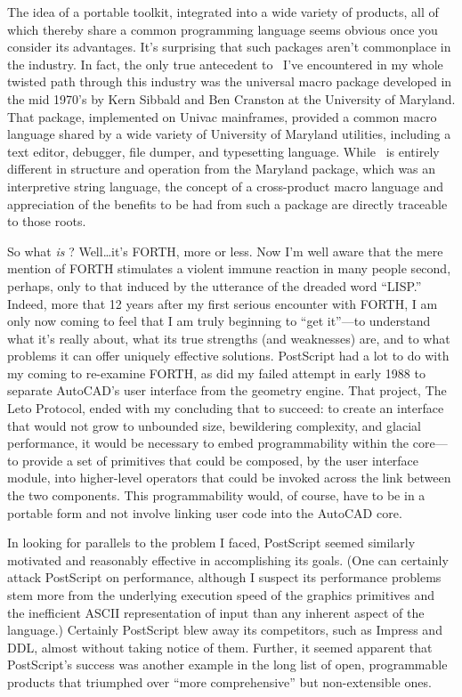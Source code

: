 \documentclass[twocolumn]{article}
\begin{document}
The idea of a portable toolkit, integrated into a wide variety of
products, all of which thereby share a common programming language
seems obvious once you consider its advantages.  It's surprising
that such packages aren't commonplace in the industry.  In fact,
the only true antecedent to \atlast\ I've encountered in my whole twisted
path through this industry was the universal macro package developed
in the mid 1970's by Kern Sibbald and Ben Cranston at the University
of Maryland.  That package, implemented on Univac mainframes, provided
a common macro language shared by a wide variety of University of
Maryland utilities, including a text editor, debugger, file dumper,
and typesetting language.  While \atlast\ is entirely different in
structure and operation from the Maryland package, which was an
interpretive string language, the concept of a cross-product macro
language and appreciation of the benefits to be had from such a
package are directly traceable to those roots.

So what {\em is} \atlast?  Well\ldots it's FORTH, more or less.
Now I'm well aware that the mere mention of FORTH stimulates a violent
immune reaction in many people second, perhaps, only to that induced by the
utterance of the dreaded word ``LISP\@.''  Indeed, more that 12 years
after my first serious encounter with FORTH, I am only now coming to
feel that I am truly beginning to ``get it''---to understand what it's
really about, what its true strengths (and weaknesses) are, and to what
problems it can offer uniquely effective solutions.  PostScript had
a lot to do with my coming to re-examine FORTH, as did my failed
attempt in early 1988 to separate AutoCAD's user interface from the
geometry engine.  That project, The Leto Protocol, ended with my
concluding that to succeed: to create an interface that would not
grow to unbounded size, bewildering complexity, and glacial
performance, it would be necessary to embed programmability within the
core---to provide a set of primitives that could be composed, by the
user interface module, into higher-level operators that could be
invoked across the link between the two components.  This
programmability would, of course, have to be in a portable form and
not involve linking user code into the AutoCAD core.

In looking for parallels to the problem I faced, PostScript seemed
similarly motivated and reasonably effective in accomplishing its
goals.  (One can certainly attack PostScript on performance, although
I suspect its performance problems stem more from the underlying
execution speed of the graphics primitives and the inefficient ASCII
representation of input than any inherent aspect of the language.)
Certainly PostScript blew away its competitors, such as Impress and
DDL, almost without taking notice of them.  Further, it seemed
apparent that PostScript's success was another example in the long
list of open, programmable products that triumphed over ``more
comprehensive'' but non-extensible ones.
\end{document}
